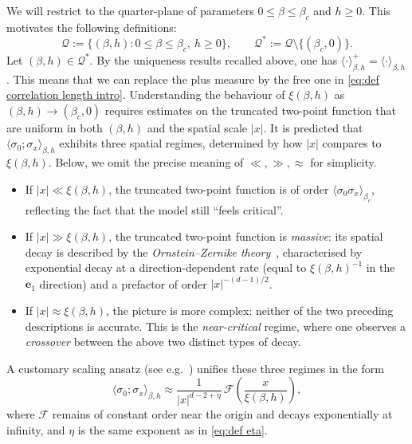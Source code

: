 \documentclass[10pt,a4paper]{amsart}
\numberwithin{equation}{section}
\begin{document}
We will restrict to the quarter-plane of parameters $0\leq \beta\leq \beta_c$ and $h\geq 0$. This motivates the following definitions: 
\begin{equation}
    \mathcal Q:=\{(\beta,h):0\leq\beta\leq\beta_c,\ h\geq0\}, \qquad \mathcal Q^*:=\mathcal Q\setminus \{(\beta_c,0)\}.
\end{equation}
Let $(\beta,h)\in \mathcal Q^*$.
By the uniqueness results recalled above, one has $\langle\cdot\rangle_{\beta,h}^+ 
= \langle\cdot\rangle_{\beta,h}$. This means that we can replace the plus measure by the free one in \eqref{eq:def correlation length intro}. Understanding the behaviour of 
$\xi(\beta,h)$ as $(\beta,h)\to(\beta_c,0)$ requires estimates on the 
truncated two-point function that are uniform in both $(\beta,h)$ and the 
spatial scale $|x|$. It is predicted that $\langle\sigma_0;\sigma_x\rangle_{\beta,h}$ 
exhibits three spatial regimes, determined by how $|x|$ compares to 
$\xi(\beta,h)$.
Below, we omit the precise meaning of $\ll,\gg,\approx$ for simplicity.
\begin{itemize}
    \item If $|x|\ll\xi(\beta,h)$, the truncated two-point function 
    is of order $\langle \sigma_0\sigma_x\rangle_{\beta_c}$, 
    reflecting the fact that the model still ``feels critical''.

    \item If $|x|\gg\xi(\beta,h)$, the truncated two-point function is 
    \emph{massive}: its spatial 
    decay is described by the \emph{Ornstein--Zernike theory}~\cite{ornstein1914accidental,zernike1916clustering}, 
    characterised by exponential decay at a direction-dependent rate 
    (equal to $\xi(\beta,h)^{-1}$ in the $\mathbf{e}_1$ direction) and 
    a prefactor of order $|x|^{-(d-1)/2}$. 

    \item If $|x|\approx\xi(\beta,h)$, the picture is more complex: 
    neither of the two preceding descriptions is accurate. This is the 
    \emph{near-critical} regime, where one observes a \emph{crossover} between the above two distinct types of decay.
\end{itemize} A customary scaling
ansatz (see e.g.~\cite{Fisher1998renormalization}) unifies these three regimes in the form 
\begin{equation}\label{eq:expected behaviour in the near-critical regime}
    \langle\sigma_0;\sigma_x\rangle_{\beta,h}
    \approx
    \frac{1}{|x|^{d-2+\eta}}\,
    \mathcal F\left(\frac{x}{\xi(\beta,h)}\right),
\end{equation} 
where $\mathcal F$ remains of constant order near the origin and decays
exponentially at infinity, and $\eta$ is the same exponent as in \eqref{eq:def eta}.
%
\end{document}
